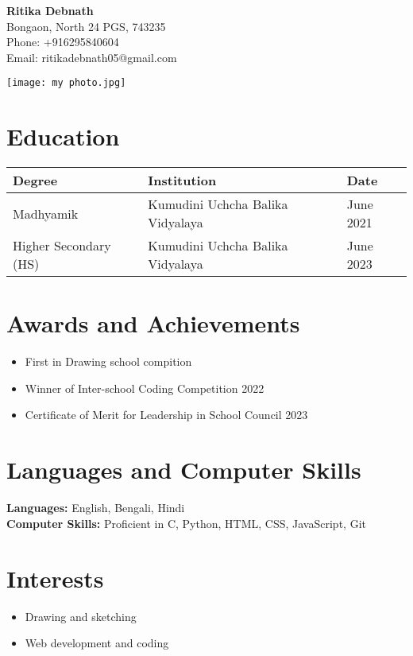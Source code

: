 \documentclass[a4paper,10pt]{article}
\begin{document}
\begin{minipage}{0.7\textwidth}
    \vspace{-0.5in}
    \textbf{\Huge Ritika Debnath} \\
    Bongaon, North 24 PGS, 743235 \\
    Phone: +916295840604 \\
    Email: ritikadebnath05@gmail.com
\end{minipage}
\hfill
\begin{minipage}{0.2\textwidth}
    \texttt{[image: my photo.jpg]} %
\end{minipage}

\vspace{0.5cm}

\section*{Education}
\begin{tabular}{|p{6cm}|p{4cm}|p{4cm}|}
    \hline
    \textbf{Degree} & \textbf{Institution} & \textbf{Date} \\ \hline
    Madhyamik & Kumudini Uchcha Balika Vidyalaya & June 2021 \\ \hline
    Higher Secondary (HS) & Kumudini Uchcha Balika Vidyalaya & June 2023 \\ \hline
\end{tabular}

\vspace{0.5cm}

\section*{Awards and Achievements}
\begin{itemize}
    \item First in Drawing school compition
    \item Winner of Inter-school Coding Competition 2022
    \item Certificate of Merit for Leadership in School Council 2023
\end{itemize}

\vspace{0.5cm}

\section*{Languages and Computer Skills}
\textbf{Languages:} English, Bengali, Hindi \\
\textbf{Computer Skills:} Proficient in C, Python, HTML, CSS, JavaScript, Git

\vspace{0.5cm}

\section*{Interests}
\begin{itemize}
    \item Drawing and sketching
    \item Web development and coding
\end{itemize}
\end{document}
